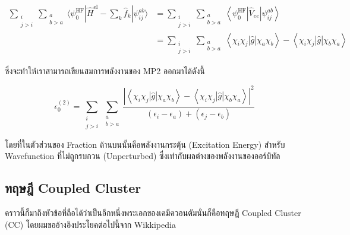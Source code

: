 \begin{equation}
  \begin{aligned}
    \sum_{\substack{i            \\ j>i}} \sum_{\substack{a \\ b>a}}
    \langle
    \psi_{0}^{\mathrm{HF}} | \hat{H}^{\mathrm{el}}
    - \sum_{k} \hat{f}_{k} | \psi_{i j}^{a b}
    \rangle &
    = \sum_{\substack{i          \\ j>i}} \sum_{\substack{a \\ b>a}}
    \left\langle
    \psi_{0}^{\mathrm{HF}}
    \left|\hat{V}_{e e}\right|
    \psi_{i j}^{a b}
    \right\rangle                \\
            & =\sum_{\substack{i \\ j>i}} \sum_{\substack{a \\ b>a}}
    \left\langle
    \chi_{i} \chi_{j}|\hat{g}| \chi_{a} \chi_{b}
    \right\rangle
    - \left\langle
    \chi_{i} \chi_{j}|\hat{g}| \chi_{b} \chi_{a}
    \right\rangle
  \end{aligned}
\end{equation}

\noindent ซึ่งจะทำให้เราสามารถเขียนสมการพลังงานของ MP2 ออกมาได้ดังนี้

\begin{equation}
  \epsilon^{(2)}_{0}
  =
  \sum_{\substack{i \\ j>i}} \sum_{\substack{a \\ b>a}}
  \frac
  {
  \left| \left\langle \chi_{i}\chi_{j} | \hat{g} | \chi_{a}\chi_{b} \right\rangle
  - \left\langle \chi_{i}\chi_{j} | \hat{g} | \chi_{b}\chi_{a} \right\rangle \right|^{2}
  }
  {
  (\epsilon_{i} - \epsilon_{a}) + (\epsilon_{j} - \epsilon_{b})
  }
\end{equation}

\noindent โดยที่ในตัวส่วนของ Fraction ด้านบนนั้นคือพลังงานกระตุ้น (Excitation Energy) สำหรับ Wavefunction ที่ไม่ถูกรบกวน
(Unperturbed) ซึ่งเท่ากับผลต่างของพลังงานของออร์บิทัล

\subsection{ทฤษฎี Coupled Cluster}

คราวนี้ก็มาถึงหัวข้อที่ถือได้ว่าเป็นอีกหนึ่งพระเอกของเคมีควอนตัมนั่นก็คือทฤษฎี Coupled Cluster (CC) โดยผมขออ้างอิงประโยคต่อไปนี้จาก Wikkipedia

